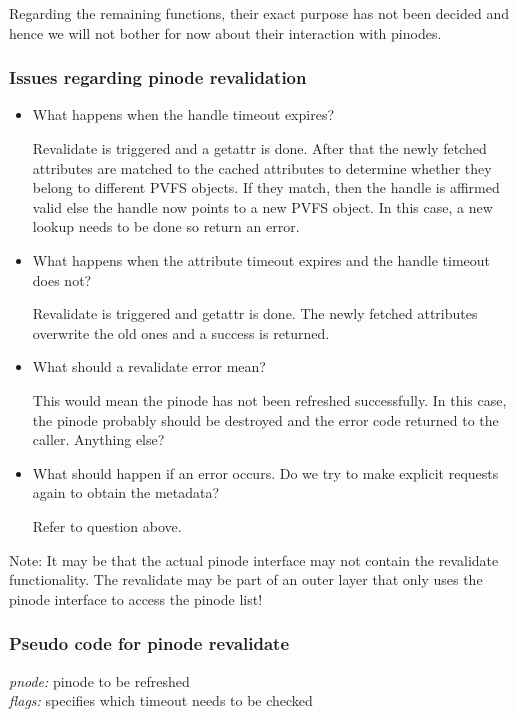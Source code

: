 \documentclass[11pt, letterpaper]{article}
\begin{document}
Regarding the remaining functions, their exact purpose has not been 
decided and hence we will not bother for now about their interaction with
pinodes.

\subsubsection{Issues regarding pinode revalidation}
\begin{itemize}

\item{What happens when the handle timeout expires?}

Revalidate is triggered and a getattr is done. After that the 
newly fetched attributes are matched to the cached attributes 
to determine whether they belong to different PVFS objects.
If they match, then the handle is affirmed valid else the handle
now points to a new PVFS object. In this case, a new lookup needs
to be done so return an error.

\item{What happens when the attribute timeout expires and the handle 
timeout does not?} 

Revalidate is triggered and getattr is done. The newly fetched
attributes overwrite the old ones and a success is returned. 

\item{What should a revalidate error mean?} 

This would mean the pinode has not been refreshed successfully.
In this case, the pinode probably should be destroyed and the 
error code returned to the caller. Anything else? 

\item{What should happen if an error occurs. Do we try 
to make explicit requests again to obtain the metadata?}

Refer to question above.
\end{itemize}

Note: It may be that the actual pinode interface may not contain the
revalidate functionality. The revalidate may be part of an outer layer
that only uses the pinode interface to access the pinode list!

\subsubsection{Pseudo code for pinode revalidate}
\textit{pnode:} pinode to be refreshed \\
\textit{flags:} specifies which timeout needs to be checked \\
\end{document}
